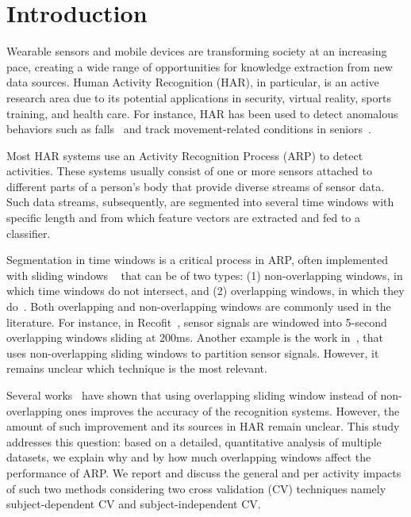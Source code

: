 \documentclass[sensors,article,submit,moreauthors,pdftex]{Definitions/mdpi}
\begin{document}
\section{Introduction}
Wearable sensors and mobile devices are transforming society at an 
increasing pace, creating a wide range of opportunities for knowledge 
extraction from new data sources. Human Activity Recognition (HAR), in 
particular, is an active research area due to its potential applications in 
security, virtual reality, sports training, and health care. For 
instance, HAR has been used to detect anomalous behaviors such as 
falls~\cite{bianchi2010barometric} and track movement-related 
conditions in seniors~\cite{chen2014implementing}.

Most HAR systems use an Activity 
Recognition Process (ARP) to detect activities. These systems 
usually consist of one or more sensors attached to different parts of a person's body that provide diverse streams of sensor data. Such data streams, subsequently, are segmented into several time windows with specific length and from which feature vectors are extracted and fed to a classifier. 


Segmentation in time windows is a critical process in ARP, often implemented with 
sliding windows ~\cite{janidarmian2017comprehensive,banos2014window} that can be of two types: (1) non-overlapping windows, in which time windows do not intersect, and (2) overlapping windows, in which they do~\cite{lara2013survey}.
Both overlapping and non-overlapping windows are commonly used in the literature. For instance, in Recofit~\cite{morris2014recofit}, sensor signals are windowed into 5-second overlapping windows sliding at 200ms. Another example is the work in~\cite{banos2014window}, that uses non-overlapping sliding windows to partition sensor signals. However, it remains unclear which technique is the most relevant.

Several works~\cite{keogh2001online,janidarmian2014automated} have shown that using overlapping sliding window instead of non-overlapping ones improves the accuracy of the recognition systems. However, the amount of such improvement and its sources in HAR remain unclear. This study addresses this question: based on a detailed, quantitative analysis of multiple datasets, we  explain why and by how much overlapping windows affect the performance of ARP. We report and discuss the general and per activity impacts of such two methods considering two cross validation (CV) techniques namely subject-dependent CV and subject-independent CV. 
\end{document}
